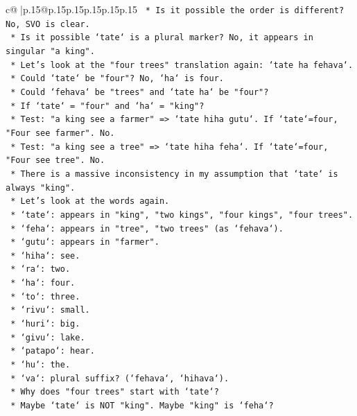 \documentclass{article}
\begin{document}
{\begin{supertabular}{c@{$\;$}|p{.15\linewidth}@{}p{.15\linewidth}p{.15\linewidth}p{.15\linewidth}p{.15\linewidth}p{.15\linewidth}}
{{{\texttt{        *   Is it possible the order is different? No, SVO is clear.} \\
\texttt{        *   Is it possible `tate` is a plural marker? No, it appears in singular "a king".} \\
\texttt{        *   Let's look at the "four trees" translation again: `tate ha fehava`.} \\
\texttt{        *   Could `tate` be "four"? No, `ha` is four.} \\
\texttt{        *   Could `fehava` be "trees" and `tate ha` be "four"?} \\
\texttt{        *   If `tate` = "four" and `ha` = "king"?} \\
\texttt{        *   Test: "a king see a farmer" => `tate hiha gutu`. If `tate`=four, "Four see farmer". No.} \\
\texttt{        *   Test: "a king see a tree" => `tate hiha feha`. If `tate`=four, "Four see tree". No.} \\
\texttt{        *   There is a massive inconsistency in my assumption that `tate` is always "king".} \\
\texttt{        *   Let's look at the words again.} \\
\texttt{        *   `tate`: appears in "king", "two kings", "four kings", "four trees".} \\
\texttt{        *   `feha`: appears in "tree", "two trees" (as `fehava`).} \\
\texttt{        *   `gutu`: appears in "farmer".} \\
\texttt{        *   `hiha`: see.} \\
\texttt{        *   `ra`: two.} \\
\texttt{        *   `ha`: four.} \\
\texttt{        *   `to`: three.} \\
\texttt{        *   `rivu`: small.} \\
\texttt{        *   `huri`: big.} \\
\texttt{        *   `givu`: lake.} \\
\texttt{        *   `patapo`: hear.} \\
\texttt{        *   `hu`: the.} \\
\texttt{        *   `va`: plural suffix? (`fehava`, `hihava`).} \\
\texttt{        *   Why does "four trees" start with `tate`?} \\
\texttt{        *   Maybe `tate` is NOT "king". Maybe "king" is `feha`?} \\
}}}
\end{supertabular}}
\end{document}
